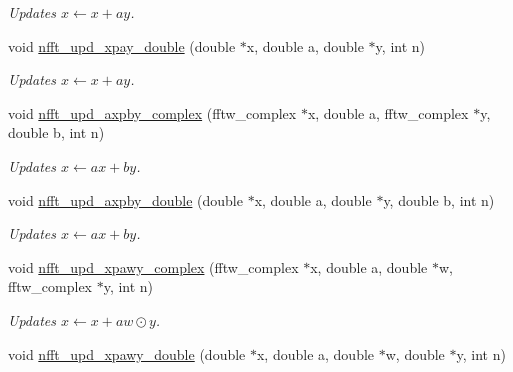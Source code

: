 \begin{CompactItemize}
\begin{CompactList}\small\item\em Updates $x \leftarrow x + a y$. \item\end{CompactList}\item 
\hypertarget{group__nfftutil_g2389c3b56a484a3f165b7d9203700064}{
void \hyperlink{group__nfftutil_g2389c3b56a484a3f165b7d9203700064}{nfft\_\-upd\_\-xpay\_\-double} (double $\ast$x, double a, double $\ast$y, int n)}
\label{group__nfftutil_g2389c3b56a484a3f165b7d9203700064}

\begin{CompactList}\small\item\em Updates $x \leftarrow x + a y$. \item\end{CompactList}\item 
\hypertarget{group__nfftutil_g903a4b3ed369dcfe67b9379a238ed23d}{
void \hyperlink{group__nfftutil_g903a4b3ed369dcfe67b9379a238ed23d}{nfft\_\-upd\_\-axpby\_\-complex} (fftw\_\-complex $\ast$x, double a, fftw\_\-complex $\ast$y, double b, int n)}
\label{group__nfftutil_g903a4b3ed369dcfe67b9379a238ed23d}

\begin{CompactList}\small\item\em Updates $x \leftarrow a x + b y$. \item\end{CompactList}\item 
\hypertarget{group__nfftutil_g75e403e92875b0b919a555f8cede0e8d}{
void \hyperlink{group__nfftutil_g75e403e92875b0b919a555f8cede0e8d}{nfft\_\-upd\_\-axpby\_\-double} (double $\ast$x, double a, double $\ast$y, double b, int n)}
\label{group__nfftutil_g75e403e92875b0b919a555f8cede0e8d}

\begin{CompactList}\small\item\em Updates $x \leftarrow a x + b y$. \item\end{CompactList}\item 
\hypertarget{group__nfftutil_gd8e10773e59818c88a8ea2cb560b936e}{
void \hyperlink{group__nfftutil_gd8e10773e59818c88a8ea2cb560b936e}{nfft\_\-upd\_\-xpawy\_\-complex} (fftw\_\-complex $\ast$x, double a, double $\ast$w, fftw\_\-complex $\ast$y, int n)}
\label{group__nfftutil_gd8e10773e59818c88a8ea2cb560b936e}

\begin{CompactList}\small\item\em Updates $x \leftarrow x + a w\odot y$. \item\end{CompactList}\item 
\hypertarget{group__nfftutil_gc5db5bbc58f772844cf0caf5fd9fafb0}{
void \hyperlink{group__nfftutil_gc5db5bbc58f772844cf0caf5fd9fafb0}{nfft\_\-upd\_\-xpawy\_\-double} (double $\ast$x, double a, double $\ast$w, double $\ast$y, int n)}
\label{group__nfftutil_gc5db5bbc58f772844cf0caf5fd9fafb0}


\end{CompactItemize}
